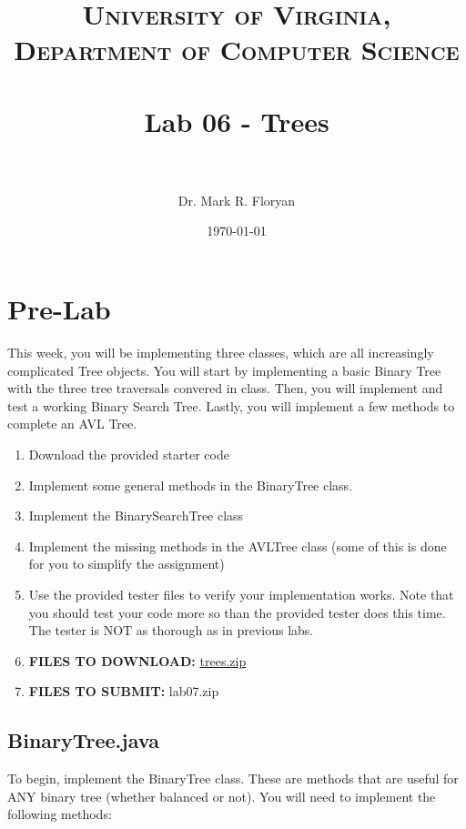 \documentclass[paper=a4, fontsize=11pt, parskip=full]{scrartcl} %
\title{
\normalfont \normalsize
\textsc{University of Virginia, Department of Computer Science} \\ [25pt] %
\horrule{0.5pt} \\[0.4cm] %
\huge Lab 06 - Trees \\ %
\horrule{2pt} \\[0.5cm] %
}
\author{Dr. Mark R. Floryan} %
\date{\normalsize\today} %
\numberwithin{equation}{section} %
\numberwithin{figure}{section} %
\numberwithin{table}{section} %
\begin{document}
\maketitle %


\section{Pre-Lab}

This week, you will be implementing three classes, which are all increasingly complicated Tree objects. You will start by implementing a basic Binary Tree with the three tree traversals convered in class. Then, you will implement and test a working Binary Search Tree. Lastly, you will implement a few methods to complete an AVL Tree.

\begin{enumerate}
	\item Download the provided starter code
	\item Implement some general methods in the BinaryTree class.
	\item Implement the BinarySearchTree class
	\item Implement the missing methods in the AVLTree class (some of this is done for you to simplify the assignment)
	\item Use the provided tester files to verify your implementation works. Note that you should test your code more so than the provided tester does this time. The tester is NOT as thorough as in previous labs.
	\item \textbf{FILES TO DOWNLOAD:} \href{https://markfloryan.github.io/dsa1/labs/lab07%20-%20Trees/code/trees.zip}{trees.zip}
	\item \textbf{FILES TO SUBMIT:} lab07.zip
\end{enumerate}


\subsection{BinaryTree.java}

To begin, implement the BinaryTree class. These are methods that are useful for ANY binary tree (whether balanced or not). You will need to implement the following methods:
\end{document}
